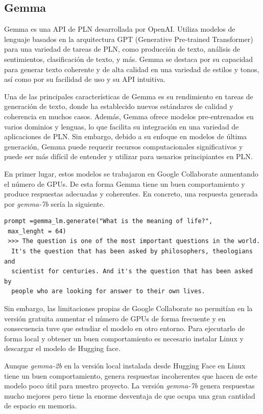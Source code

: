\subsection{Gemma}

Gemma es una API de PLN desarrollada por OpenAI. Utiliza modelos de lenguaje basados en la arquitectura GPT (Generative Pre-trained Transformer) para una variedad de tareas de PLN, como producción de texto, análisis de sentimientos, clasificación de texto, y más. Gemma se destaca por su capacidad para generar texto coherente y de alta calidad en una variedad de estilos y tonos, así como por su facilidad de uso y su API intuitiva.

Una de las principales características de Gemma es su rendimiento en tareas de generación de texto, donde ha establecido nuevos estándares de calidad y coherencia en muchos casos. Además, Gemma ofrece modelos pre-entrenados en varios dominios y lenguas, lo que facilita su integración en una variedad de aplicaciones de PLN. Sin embargo, debido a su enfoque en modelos de última generación, Gemma puede requerir recursos computacionales significativos y puede ser más difícil de entender y utilizar para usuarios principiantes en PLN.


En primer lugar, estos modelos se trabajaron en Google Collaborate aumentando el número de GPUs. De esta forma Gemma tiene un buen comportamiento y produce respuestas adecuadas y coherentes. En concreto, una respuesta generada por \textit{gemma-7b} sería la siguiente.

	\begin{verbatim}
prompt =gemma_lm.generate("What is the meaning of life?",
 max_lenght = 64)
 >>> The question is one of the most important questions in the world.
  It's the question that has been asked by philosophers, theologians and
  scientist for centuries. And it's the question that has been asked by
  people who are looking for answer to their own lives. 
	\end{verbatim}

Sin embargo, las limitaciones propias de Google Collaborate no permitían en la versión gratuita aumentar el número de GPUs de forma frecuente y en consecuencia tuve que estudiar el modelo en otro entorno. Para ejecutarlo de forma local y obtener un buen comportamiento es necesario instalar Linux y descargar el modelo de Hugging face. 

Aunque \textit{gemma-2b} en la versión local instalada desde Hugging Face en Linux tiene un buen comportamiento, genera respuestas incoherentes que hacen de este modelo poco útil para nuestro proyecto. La versión \textit{gemma-7b} genera respuestas mucho mejores pero tiene la enorme desventaja de que ocupa una gran cantidad de espacio en memoria.

